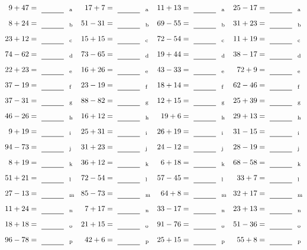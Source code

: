 \documentclass
[
  draft    = true,
  fontsize = 11pt,
  parskip  = half-
]
{scrartcl}
\begin{document}
\clearpage
\begin{align*}
    \pline{9+47}&=\rline{a}
  & \pline{17+7}&=\rline{a}
  & \pline{11+13}&=\rline{a}
  & \pline{25-17}&=\rline{a} \\[1ex]
    \pline{8+24}&=\rline{b}
  & \pline{51-31}&=\rline{b}
  & \pline{69-55}&=\rline{b}
  & \pline{31+23}&=\rline{b} \\[1ex]
    \pline{23+12}&=\rline{c}
  & \pline{15+15}&=\rline{c}
  & \pline{72-54}&=\rline{c}
  & \pline{11+19}&=\rline{c} \\[1ex]
    \pline{74-62}&=\rline{d}
  & \pline{73-65}&=\rline{d}
  & \pline{19+44}&=\rline{d}
  & \pline{38-17}&=\rline{d} \\[1ex]
    \pline{22+23}&=\rline{e}
  & \pline{16+26}&=\rline{e}
  & \pline{43-33}&=\rline{e}
  & \pline{72+9}&=\rline{e} \\[1ex]
    \pline{37-19}&=\rline{f}
  & \pline{23-19}&=\rline{f}
  & \pline{18+14}&=\rline{f}
  & \pline{62-46}&=\rline{f} \\[1ex]
    \pline{37-31}&=\rline{g}
  & \pline{88-82}&=\rline{g}
  & \pline{12+15}&=\rline{g}
  & \pline{25+39}&=\rline{g} \\[1ex]
    \pline{46-26}&=\rline{h}
  & \pline{16+12}&=\rline{h}
  & \pline{19+6}&=\rline{h}
  & \pline{29+13}&=\rline{h} \\[1ex]
    \pline{9+19}&=\rline{i}
  & \pline{25+31}&=\rline{i}
  & \pline{26+19}&=\rline{i}
  & \pline{31-15}&=\rline{i} \\[1ex]
    \pline{94-73}&=\rline{j}
  & \pline{31+23}&=\rline{j}
  & \pline{24-12}&=\rline{j}
  & \pline{28-19}&=\rline{j} \\[1ex]
    \pline{8+19}&=\rline{k}
  & \pline{36+12}&=\rline{k}
  & \pline{6+18}&=\rline{k}
  & \pline{68-58}&=\rline{k} \\[1ex]
    \pline{51+21}&=\rline{l}
  & \pline{72-54}&=\rline{l}
  & \pline{57-45}&=\rline{l}
  & \pline{33+7}&=\rline{l} \\[1ex]
    \pline{27-13}&=\rline{m}
  & \pline{85-73}&=\rline{m}
  & \pline{64+8}&=\rline{m}
  & \pline{32+17}&=\rline{m} \\[1ex]
    \pline{11+24}&=\rline{n}
  & \pline{7+17}&=\rline{n}
  & \pline{33-17}&=\rline{n}
  & \pline{23+13}&=\rline{n} \\[1ex]
    \pline{18+18}&=\rline{o}
  & \pline{21+15}&=\rline{o}
  & \pline{91-76}&=\rline{o}
  & \pline{51-36}&=\rline{o} \\[1ex]
    \pline{96-78}&=\rline{p}
  & \pline{42+6}&=\rline{p}
  & \pline{25+15}&=\rline{p}
  & \pline{55+8}&=\rline{p}
\end{align*}
\end{document}
